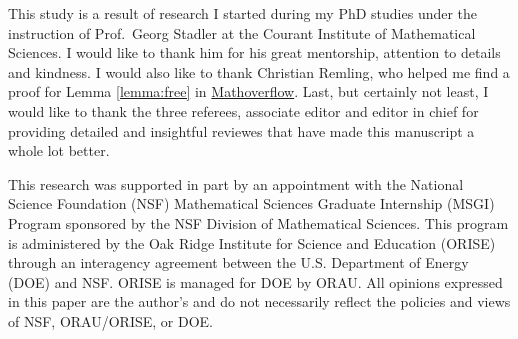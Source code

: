 \documentclass[ba]{imsart}
\theoremstyle{plain}
\theoremstyle{definition}
\theoremstyle{remark}
\begin{document}
\begin{acks}[Acknowledgments]
  This study is a result of research I started during my PhD studies
under the instruction of Prof.~Georg Stadler at the Courant Institute
of Mathematical Sciences. I would like to thank him for his great
mentorship, attention to details and kindness. I would also like to
thank Christian Remling, who helped me find a proof for Lemma
\ref{lemma:free} in
\href{https://mathoverflow.net/questions/280168/redistribute-diagonal-entries-of-a-matrix/280203#280203c}{Mathoverflow}.
Last, but certainly not least, I would like to thank the three
referees, associate editor and editor in chief for providing detailed
and insightful reviewes that have made this manuscript a whole lot
better.
   
  This research was supported in part by an appointment with the
National Science Foundation (NSF) Mathematical Sciences Graduate
Internship (MSGI) Program sponsored by the NSF Division of
Mathematical Sciences. This program is administered by the Oak Ridge
Institute for Science and Education (ORISE) through an interagency
agreement between the U.S. Department of Energy (DOE) and NSF. ORISE
is managed for DOE by ORAU. All opinions expressed in this paper are
the author's and do not necessarily reflect the policies and views of
NSF, ORAU/ORISE, or DOE.
 \end{acks}



\end{document}
